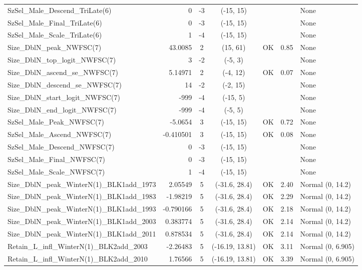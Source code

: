 \documentclass[12pt,]{article}
\begin{document}
\begin{landscape}
\begin{longtable}{lrcccll}
  SzSel\_Male\_Descend\_TriLate(6) & 0 & -3 & (-15, 15) &  &  & None \\ 
  SzSel\_Male\_Final\_TriLate(6) & 0 & -3 & (-15, 15) &  &  & None \\ 
  SzSel\_Male\_Scale\_TriLate(6) & 1 & -4 & (-15, 15) &  &  & None \\ 
  Size\_DblN\_peak\_NWFSC(7) & 43.0085 & 2 & (15, 61) & OK & 0.85 & None \\ 
  Size\_DblN\_top\_logit\_NWFSC(7) & 3 & -2 & (-5, 3) &  &  & None \\ 
  Size\_DblN\_ascend\_se\_NWFSC(7) & 5.14971 & 2 & (-4, 12) & OK & 0.07 & None \\ 
  Size\_DblN\_descend\_se\_NWFSC(7) & 14 & -2 & (-2, 15) &  &  & None \\ 
  Size\_DblN\_start\_logit\_NWFSC(7) & -999 & -4 & (-15, 5) &  &  & None \\ 
  Size\_DblN\_end\_logit\_NWFSC(7) & -999 & -4 & (-5, 5) &  &  & None \\ 
  SzSel\_Male\_Peak\_NWFSC(7) & -5.0654 & 3 & (-15, 15) & OK & 0.72 & None \\ 
  SzSel\_Male\_Ascend\_NWFSC(7) & -0.410501 & 3 & (-15, 15) & OK & 0.08 & None \\ 
  SzSel\_Male\_Descend\_NWFSC(7) & 0 & -3 & (-15, 15) &  &  & None \\ 
  SzSel\_Male\_Final\_NWFSC(7) & 0 & -3 & (-15, 15) &  &  & None \\ 
  SzSel\_Male\_Scale\_NWFSC(7) & 1 & -4 & (-15, 15) &  &  & None \\ 
  Size\_DblN\_peak\_WinterN(1)\_BLK1add\_1973 & 2.05549 & 5 & (-31.6, 28.4) & OK & 2.40 & Normal (0, 14.2) \\ 
  Size\_DblN\_peak\_WinterN(1)\_BLK1add\_1983 & -1.98219 & 5 & (-31.6, 28.4) & OK & 2.29 & Normal (0, 14.2) \\ 
  Size\_DblN\_peak\_WinterN(1)\_BLK1add\_1993 & -0.790166 & 5 & (-31.6, 28.4) & OK & 2.18 & Normal (0, 14.2) \\ 
  Size\_DblN\_peak\_WinterN(1)\_BLK1add\_2003 & 0.383774 & 5 & (-31.6, 28.4) & OK & 2.14 & Normal (0, 14.2) \\ 
  Size\_DblN\_peak\_WinterN(1)\_BLK1add\_2011 & 0.878534 & 5 & (-31.6, 28.4) & OK & 2.14 & Normal (0, 14.2) \\ 
  Retain\_L\_infl\_WinterN(1)\_BLK2add\_2003 & -2.26483 & 5 & (-16.19, 13.81) & OK & 3.11 & Normal (0, 6.905) \\ 
  Retain\_L\_infl\_WinterN(1)\_BLK2add\_2010 & 1.76566 & 5 & (-16.19, 13.81) & OK & 3.39 & Normal (0, 6.905) \\ 

\end{longtable}
\end{landscape}
\end{document}
